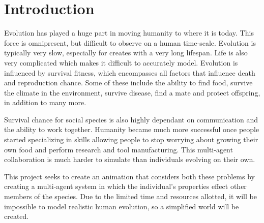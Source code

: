 \documentclass{egpubl}
\begin{document}
\section{Introduction}
Evolution has played a huge part in moving humanity to where it is today. This force is omnipresent, but difficult to observe on a human time-scale. Evolution is typically very slow, especially for creates with a very long lifespan. Life is also very complicated which makes it difficult to accurately model. Evolution is influenced by survival fitness, which encompasses all factors that influence death and reproduction chance. Some of these include the ability to find food, survive the climate in the environment, survive disease, find a mate and protect offspring, in addition to many more.
\par
Survival chance for social species is also highly dependant on communication and the ability to work together. Humanity became much more successful once people started specializing in skills allowing people to stop worrying about growing their own food and perform research and tool manufacturing. This multi-agent collaboration is much harder to simulate than individuals evolving on their own.
\par
This project seeks to create an animation that considers both these problems by creating a multi-agent system in which the individual's properties effect other members of the species. Due to the limited time and resources allotted, it will be impossible to model realistic human evolution, so a simplified world will be created.
\end{document}
